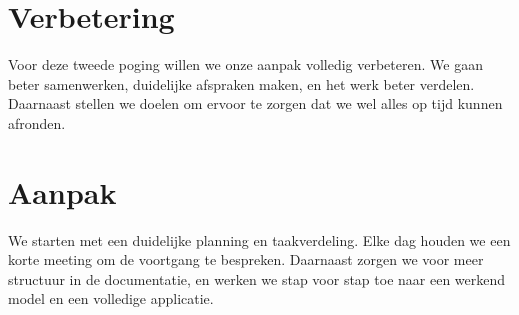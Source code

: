 \documentclass{article}
\begin{document}
\newpage
\section{Verbetering}
Voor deze tweede poging willen we onze aanpak volledig verbeteren. We gaan beter samenwerken, duidelijke afspraken maken, en het werk beter verdelen. Daarnaast stellen we doelen om ervoor te zorgen dat we wel alles op tijd kunnen afronden.

\newpage
\section{Aanpak}
We starten met een duidelijke planning en taakverdeling. Elke dag houden we een korte meeting om de voortgang te bespreken. Daarnaast zorgen we voor meer structuur in de documentatie, en werken we stap voor stap toe naar een werkend model en een volledige applicatie.
\end{document}

